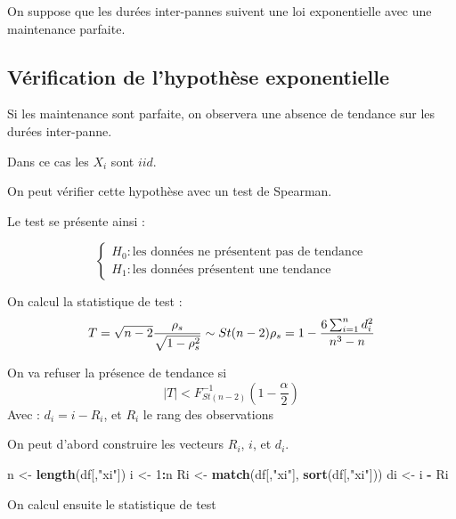 \documentclass[
]{article}
\newenvironment{Shaded}{\begin{snugshade}}{\end{snugshade}}
\newcommand{\DecValTok}[1]{\textcolor[rgb]{0.00,0.00,0.81}{#1}}
\newcommand{\FunctionTok}[1]{\textcolor[rgb]{0.13,0.29,0.53}{\textbf{#1}}}
\newcommand{\NormalTok}[1]{#1}
\newcommand{\OtherTok}[1]{\textcolor[rgb]{0.56,0.35,0.01}{#1}}
\newcommand{\SpecialCharTok}[1]{\textcolor[rgb]{0.81,0.36,0.00}{\textbf{#1}}}
\newcommand{\StringTok}[1]{\textcolor[rgb]{0.31,0.60,0.02}{#1}}
\begin{document}
On suppose que les durées inter-pannes suivent une loi exponentielle
avec une maintenance parfaite.

\subsection{Vérification de l'hypothèse
exponentielle}\label{vuxe9rification-de-lhypothuxe8se-exponentielle}

Si les maintenance sont parfaite, on observera une absence de tendance
sur les durées inter-panne.

Dans ce cas les \(X_i\) sont \(iid\).

On peut vérifier cette hypothèse avec un test de Spearman.

Le test se présente ainsi :

\[
\left\{
  \begin{array}{ll}
    H_0 : \mbox{les données ne présentent pas de tendance} \\
    H_1 : \mbox{les données présentent une tendance}
  \end{array}
\right.
\]

On calcul la statistique de test : \[
T = \sqrt{n-2}\frac{\rho_s}{\sqrt{1-\rho_s^2}} \sim St(n-2) \\
\rho_s = 1 - \frac{6\sum_{i=1}^n d_i^2}{n^3-n}
\]

On va refuser la présence de tendance si \[
|T|<F_{St(n-2)}^{-1} \left(1-\frac{\alpha}{2} \right)
\] Avec : \(d_i = i - R_i\), et \(R_i\) le rang des observations

On peut d'abord construire les vecteurs \(R_i\), \(i\), et \(d_i\).

\begin{Shaded}
\begin{Highlighting}[]
\NormalTok{n }\OtherTok{\textless{}{-}} \FunctionTok{length}\NormalTok{(df[,}\StringTok{"xi"}\NormalTok{])}
\NormalTok{i }\OtherTok{\textless{}{-}} \DecValTok{1}\SpecialCharTok{:}\NormalTok{n}
\NormalTok{Ri }\OtherTok{\textless{}{-}} \FunctionTok{match}\NormalTok{(df[,}\StringTok{"xi"}\NormalTok{], }\FunctionTok{sort}\NormalTok{(df[,}\StringTok{"xi"}\NormalTok{]))}
\NormalTok{di }\OtherTok{\textless{}{-}}\NormalTok{ i }\SpecialCharTok{{-}}\NormalTok{ Ri}
\end{Highlighting}
\end{Shaded}

On calcul ensuite le statistique de test
\end{document}
